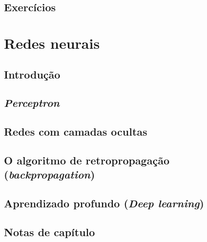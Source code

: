 \documentclass[
]{latex/krantz}
\theoremstyle{definition}
\theoremstyle{definition}
\theoremstyle{definition}
\theoremstyle{definition}
\theoremstyle{remark}
\begin{document}
\hypertarget{exercuxedcios-9}{%
\section{Exercícios}\label{exercuxedcios-9}}

\hypertarget{redes-neurais}{%
\chapter{Redes neurais}\label{redes-neurais}}

\hypertarget{introduuxe7uxe3o-10}{%
\section{Introdução}\label{introduuxe7uxe3o-10}}

\hypertarget{perceptron}{%
\section{\texorpdfstring{\emph{Perceptron}}{Perceptron}}\label{perceptron}}

\hypertarget{redes-com-camadas-ocultas}{%
\section{Redes com camadas ocultas}\label{redes-com-camadas-ocultas}}

\hypertarget{o-algoritmo-de-retropropagauxe7uxe3o-backpropagation}{%
\section{\texorpdfstring{O algoritmo de retropropagação (\emph{backpropagation})}{O algoritmo de retropropagação (backpropagation)}}\label{o-algoritmo-de-retropropagauxe7uxe3o-backpropagation}}

\hypertarget{aprendizado-profundo-deep-learning}{%
\section{\texorpdfstring{Aprendizado profundo (\emph{Deep learning})}{Aprendizado profundo (Deep learning)}}\label{aprendizado-profundo-deep-learning}}

\hypertarget{notas-de-capuxedtulo-10}{%
\section{Notas de capítulo}\label{notas-de-capuxedtulo-10}}
\end{document}
